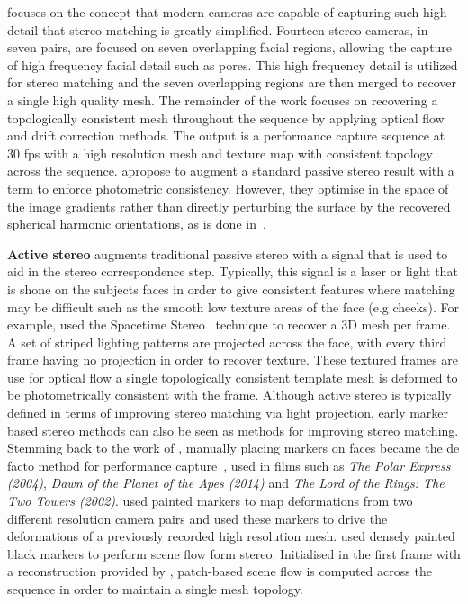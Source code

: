 focuses on the concept that modern cameras are capable of capturing such high
detail that stereo-matching is greatly simplified. Fourteen stereo cameras, in
seven pairs, are focused on seven overlapping facial regions, allowing the
capture of high frequency facial detail such as pores. This high frequency
detail is utilized for stereo matching and the seven overlapping regions are
then merged to recover a single high quality mesh. The remainder of the work
focuses on recovering a topologically consistent mesh throughout the sequence by
applying optical flow and drift correction methods. The output is a performance
capture sequence at 30 fps with a high resolution mesh and texture map
with consistent topology across the sequence.
\citet{wu2011high} apropose to augment a standard passive stereo result with 
a term to enforce photometric consistency. However, they optimise in the space 
of the image gradients rather than directly perturbing the surface by the 
recovered spherical harmonic orientations, as is done 
in~\cite{nehab2005efficiently}.

\textbf{Active stereo} augments traditional passive stereo with a signal that is
used to aid in the stereo correspondence step. Typically, this signal is a laser
or light that is shone on the subjects faces in order to give consistent
features where matching may be difficult such as the smooth low texture areas of
the face (e.g cheeks). For example, \citet{zhang2004spacetime} used the
Spacetime Stereo~\cite{zhang2003spacetime,davis2005spacetime} technique to
recover a 3D mesh per frame. A set of striped lighting patterns are projected
across the face, with every third frame having no projection in order to recover
texture. These textured frames are use for optical flow a single topologically
consistent template mesh is deformed to be photometrically consistent with the
frame.
Although active stereo is typically defined in terms of improving stereo
matching via light projection, early marker based stereo methods can also be
seen as methods for improving stereo matching.
Stemming back to the work of \citet{williams1990performance}, manually placing
markers on faces became the de facto method for performance
capture~\cite{bickel2007multi,furukawa2009dense,bredow2005mocap},
used in films such as \textit{The Polar Express (2004)},
\textit{Dawn of the Planet of the Apes (2014)} and
\textit{The Lord of the Rings: The Two Towers (2002)}.
\citet{bickel2007multi} used painted markers to map deformations from two
different resolution camera pairs and used these markers to drive the
deformations of a previously recorded high resolution mesh.
\citet{furukawa2009dense} used densely painted black markers to perform
scene flow form stereo. Initialised in the first frame with a reconstruction
provided by \citet{Furu:2010:PMVS}, patch-based scene flow is computed across
the sequence in order to maintain a single mesh topology.

